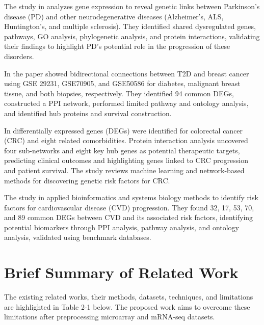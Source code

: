 The study in \cite{b10} analyzes gene expression to reveal genetic links between Parkinson's disease (PD) and other neurodegenerative diseases (Alzheimer's, ALS, Huntington's, and multiple sclerosis). They identified shared dysregulated genes, pathways, GO analysis, phylogenetic analysis, and protein interactions, validating their findings to highlight PD's potential role in the progression of these disorders.

In \cite{b13} the paper showed bidirectional connections between T2D and breast cancer using GSE 29231, GSE70905, and GSE50586 for diabetes, malignant breast tissue, and both biopsies, respectively. They identified 94 common DEGs, constructed a PPI network, performed limited pathway and ontology analysis, and identified hub proteins and survival construction.

In \cite{b14} differentially expressed genes (DEGs) were identified for colorectal cancer (CRC) and eight related comorbidities. Protein interaction analysis uncovered four sub-networks and eight key hub genes as potential therapeutic targets, predicting clinical outcomes and highlighting genes linked to CRC progression and patient survival. The study reviews machine learning and network-based methods for discovering genetic risk factors for CRC.

The study in \cite{b19} applied bioinformatics and systems biology methods to identify risk factors for cardiovascular disease (CVD) progression. They found 32, 17, 53, 70, and 89 common DEGs between CVD and its associated risk factors, identifying potential biomarkers through PPI analysis, pathway analysis, and ontology analysis, validated using benchmark databases.

\section{Brief Summary of Related Work}
\label{sec:sec2_2}

The existing related works, their methods, datasets, techniques, and limitations are highlighted in Table 2-1 below. The proposed work aims to overcome these limitations after preprocessing microarray and mRNA-seq datasets.

